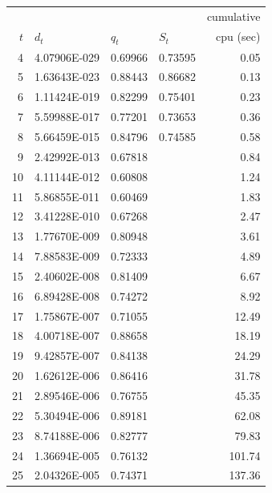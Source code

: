\begin {tabular}{|rlllr|}
\hline
 &&&&  cumulative \\
   $t$ &      $d_t$  &      $q_t$  &      $S_t$  &  cpu (sec)\\
\hline
    4  & 4.07906E-029 &     0.69966 &     0.73595 &      0.05 \\
    5  & 1.63643E-023 &     0.88443 &     0.86682 &      0.13 \\
    6  & 1.11424E-019 &     0.82299 &     0.75401 &      0.23 \\
    7  & 5.59988E-017 &     0.77201 &     0.73653 &      0.36 \\
    8  & 5.66459E-015 &     0.84796 &     0.74585 &      0.58 \\
    9  & 2.42992E-013 &     0.67818 &             &      0.84 \\
   10  & 4.11144E-012 &     0.60808 &             &      1.24 \\
   11  & 5.86855E-011 &     0.60469 &             &      1.83 \\
   12  & 3.41228E-010 &     0.67268 &             &      2.47 \\
   13  & 1.77670E-009 &     0.80948 &             &      3.61 \\
   14  & 7.88583E-009 &     0.72333 &             &      4.89 \\
   15  & 2.40602E-008 &     0.81409 &             &      6.67 \\
   16  & 6.89428E-008 &     0.74272 &             &      8.92 \\
   17  & 1.75867E-007 &     0.71055 &             &     12.49 \\
   18  & 4.00718E-007 &     0.88658 &             &     18.19 \\
   19  & 9.42857E-007 &     0.84138 &             &     24.29 \\
   20  & 1.62612E-006 &     0.86416 &             &     31.78 \\
   21  & 2.89546E-006 &     0.76755 &             &     45.35 \\
   22  & 5.30494E-006 &     0.89181 &             &     62.08 \\
   23  & 8.74188E-006 &     0.82777 &             &     79.83 \\
   24  & 1.36694E-005 &     0.76132 &             &    101.74 \\
   25  & 2.04326E-005 &     0.74371 &             &    137.36 \\
\hline
\end {tabular}
